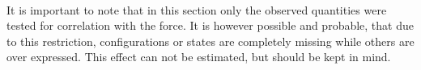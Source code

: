 %
%
%
\\
It is important to note that in this section only the observed quantities were tested for correlation with the force. It is however possible and probable, that due to this restriction, configurations or states are completely missing while others are over expressed. This effect can not be estimated, but should be kept in mind.